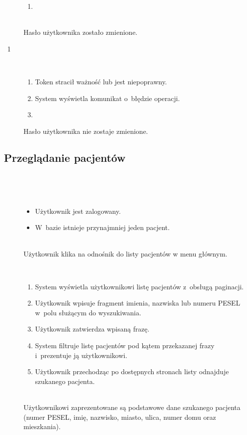 \documentclass[11pt]{aghdpl}
\begin{document}
\begin{description}
\begin{enumerate}[label=11a\arabic*.]
			\item {}
			\end{enumerate}
		\item[\useCaseWarKonc] \hfill \\ 
			Hasło użytkownika zostało zmienione.
		\item[\useCaseWyjatek~1] \hfill \\
			\begin{enumerate}[label=11b\arabic*.]
			\item Token stracił ważność lub jest niepoprawny.
			\item System wyświetla komunikat o~błędzie operacji.
			\item \useCaseEnd
			\end{enumerate}
			Hasło użytkownika nie zostaje zmienione.
	\end{description}

\subsection{Przeglądanie pacjentów}
	
	\begin{description}
		\item[\useCaseAktor] \hfill \\
			\useCaseUzytkownik
		\item[\useCaseWarPocz] \hfill \\
		\begin{itemize}
			\item Użytkownik jest zalogowany.
			\item W~bazie istnieje przynajmniej jeden pacjent.
		\end{itemize}
			
		\item[\useCaseZdarzInicj] \hfill \\
			Użytkownik klika na odnośnik do listy pacjentów w menu głównym.
		\item[\useCaseScenBaz] \hfill \\ 
			\begin{enumerate}
			\item System wyświetla użytkownikowi listę pacjentów z~obsługą paginacji.
			\item Użytkownik wpisuje fragment imienia, nazwiska lub numeru PESEL w~polu służącym do wyszukiwania.
			\item Użytkownik zatwierdza wpisaną frazę.
			\item System filtruje listę pacjentów pod kątem przekazanej frazy i~prezentuje ją użytkownikowi.
			\item Użytkownik przechodząc po dostępnych stronach listy odnajduje szukanego pacjenta.
			\end{enumerate}
		\item[\useCaseWarKonc] \hfill \\ 
			Użytkownikowi zaprezentowane są podstawowe dane szukanego pacjenta (numer PESEL, imię, nazwisko, miasto, ulica, numer domu oraz mieszkania).
	\end{description}
\end{document}
